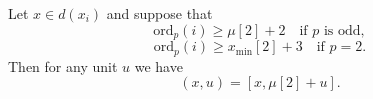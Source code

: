 Let $x \in d(x_i)$ and suppose that
$$\text{ord}_p(i) \ge \mu[2] + 2 \quad \text{if } p \text{ is odd},$$
$$\text{ord}_p(i) \ge x_{\min}[2] + 3 \quad \text{if } p = 2.$$
Then for any unit $u$ we have
$$(x, u) = [x, \mu[2] + u].$$
